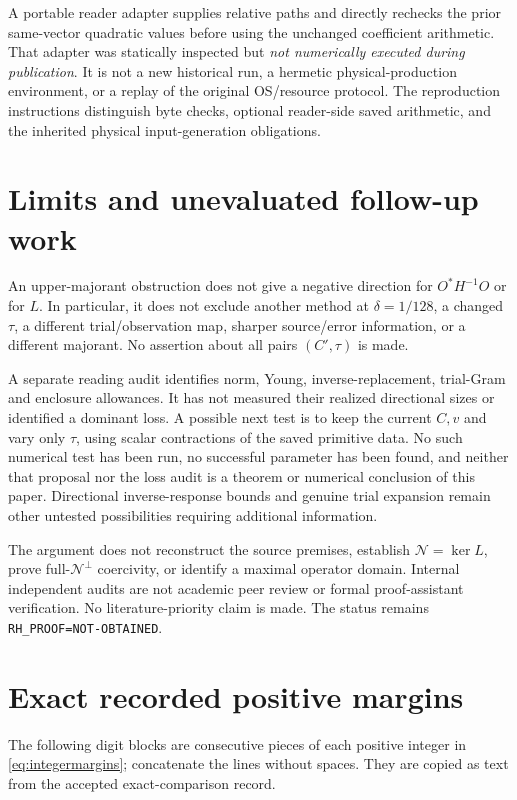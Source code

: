 \documentclass[11pt,a4paper]{article}
\newcommand{\NN}{\mathcal N}
\theoremstyle{definition}
\theoremstyle{remark}
\numberwithin{equation}{section}
\begin{document}
A portable reader adapter supplies relative paths and directly rechecks
the prior same-vector quadratic values before using the unchanged
coefficient arithmetic. That adapter was statically inspected but
\emph{not numerically executed during publication}. It is not a new
historical run, a hermetic physical-production environment, or a replay of
the original OS/resource protocol. The reproduction instructions distinguish
byte checks, optional reader-side saved arithmetic, and the inherited
physical input-generation obligations.

\section{Limits and unevaluated follow-up work}

An upper-majorant obstruction does not give a negative direction for
$O^*H^{-1}O$ or for $L$. In particular, it does not exclude another method
at $\delta=1/128$, a changed $\tau$, a different trial/observation map,
sharper source/error information, or a different majorant. No assertion
about all pairs $(C',\tau)$ is made.

A separate reading audit identifies norm, Young, inverse-replacement,
trial-Gram and enclosure allowances. It has not measured their realized
directional sizes or identified a dominant loss. A possible next test is
to keep the current $C,v$ and vary only $\tau$, using scalar contractions
of the saved primitive data. No such numerical test has been run, no
successful parameter has been found, and neither that proposal nor the
loss audit is a theorem or numerical conclusion of this paper.
Directional inverse-response bounds and genuine trial expansion remain
other untested possibilities requiring additional information.

The argument does not reconstruct the source premises, establish
$\NN=\ker L$, prove full-$\NN^\perp$ coercivity, or identify a maximal
operator domain. Internal independent audits are not academic peer review
or formal proof-assistant verification. No literature-priority claim is
made. The status remains \texttt{RH\_PROOF=NOT-OBTAINED}.

\appendix
\section{Exact recorded positive margins}\label{app:margins}

The following digit blocks are consecutive pieces of each positive integer
in \eqref{eq:integermargins}; concatenate the lines without spaces.
They are copied as text from the accepted exact-comparison record.
\end{document}
